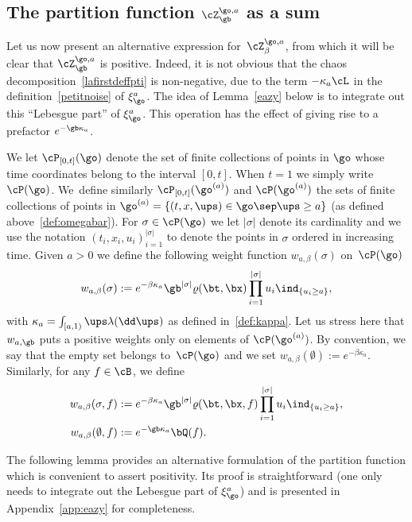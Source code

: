 \subsection{The partition function $\cZ_{\gb}^{\go,a}$ as a sum}

Let us now present an alternative expression for~$\cZ^{\go,a}_{\beta}$,
from which it will be clear that $\cZ^{\go,a}_{\gb}$ is positive.
Indeed, it is not obvious that the chaos decomposition~\eqref{lafirstdeffpti} is non-negative,
due to the term $-\kappa_a \cL$ in the definition~\eqref{petitnoise} of $\xi_{\go}^a$.
The idea of Lemma~\ref{eazy} below is to integrate out this ``Lebesgue part'' of $\xi_{\go}^a$. This operation has the effect of giving rise to a prefactor $e^{-\gb \kappa_a}$.

We let $\cP_{[0,t]}(\go)$ denote the set of finite collections of points in $\go$ whose time coordinates belong to the interval $[0,t]$. When $t=1$ we simply write $\cP(\go)$. We~define similarly $\cP_{[0,t]}(\go^{(a)})$ and $\cP(\go^{(a)})$ the sets of finite collections of points in $\go^{(a)} = \{(t,x,\ups)\in \go \sep \ups\ge a\}$ (as defined above~\eqref{def:omegabar}).
For $\sigma \in \cP(\go)$ we let $|\sigma|$ denote its cardinality
and we use the notation $(t_i,x_i,u_i)_{i=1}^{|\sigma|}$ to denote the points in $\sigma$ ordered in increasing time.
Given $a>0$ we define the following weight function $w_{a,\beta}(\sigma)$ on~$\cP(\go)$%
\begin{equation}\label{weights}
w_{a,\beta}(\sigma):= e^{- \beta \kappa_a } \gb^{|\sigma|} \varrho(\bt,\bx) \prod_{i=1}^{|\sigma|} u_i\ind_{\{u_i\geq a\}},
\end{equation}
with $\kappa_a =\int_{[a,1)} \ups \lambda (\dd \ups)$ as defined in~\eqref{def:kappa}.
Let us stress here that $w_{a,\gb}$ puts a positive weights only on
elements of $\cP(\go^{(a)})$. By convention, we say that
the empty set belongs to~$\cP(\go)$ and we set
$w_{a,\beta}(\emptyset):=e^{-\beta \kappa_a }$.
Similarly, for any $f\in \cB$, we define%
\begin{equation}\label{weightsf}
\begin{split}
w_{a,\beta}(\sigma,f)&:= e^{- \beta \kappa_a } \gb^{|\sigma|} \varrho(\bt,\bx,f) \prod_{i=1}^{|\sigma|} u_i\ind_{\{u_i\geq a\}}, \\ w_{a,\beta}(\emptyset,f)&:= e^{-\gb \kappa_a} \bQ(f).
\end{split}
\end{equation}

The following lemma provides an alternative formulation of the partition function which is convenient to assert positivity.
Its proof is straightforward (one only needs to integrate out the Lebesgue part of $\xi_{\go}^a$) and is presented in Appendix~\ref{app:eazy} for completeness.

